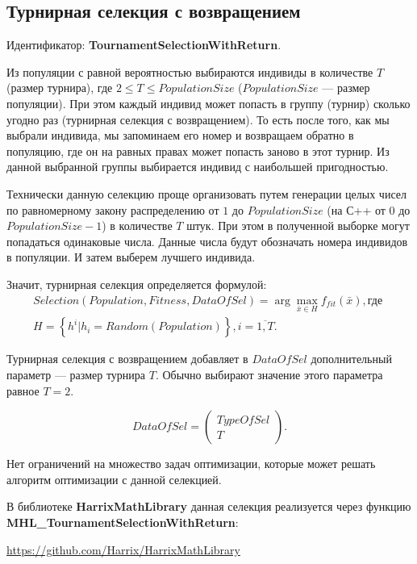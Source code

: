 \subsection{Турнирная селекция с возвращением}\label{SetOfOperatorsAlgorithms:TournamentSelectionWithReturn}

Идентификатор: \textbf{TournamentSelectionWithReturn}.

Из популяции с равной вероятностью выбираются индивиды в количестве $ T $ (размер турнира), где $ 2\leq T\leq PopulationSize $ ($ PopulationSize $ --- размер популяции). При этом каждый индивид может попасть в группу (турнир) сколько угодно раз (турнирная селекция с возвращением). То есть после того, как мы выбрали индивида, мы запоминаем его номер и возвращаем обратно в популяцию, где он на равных правах может попасть заново в этот турнир. Из данной выбранной группы выбирается индивид с наибольшей пригодностью.

Технически данную селекцию проще организовать путем генерации целых чисел по равномерному закону распределению от $ 1 $ до $ PopulationSize $ (на С++ от $ 0 $ до $ PopulationSize-1 $) в количестве $ T $ штук. При этом в полученной выборке могут попадаться одинаковые числа. Данные числа будут обозначать номера индивидов в популяции. И затем выберем лучшего индивида.

Значит, турнирная селекция определяется формулой:
\begin{align}
\label{SetOfOperatorsAlgorithms:eq:TournamentSelectionWithReturn}
Selection\left( Population, Fitness, DataOfSel\right) = \arg{\max_{\bar{x}\in H} {f_{fit}\left( \bar{x}\right) }}, \text{где }\\
H=\left\lbrace h^i | h_i=Random \left( Population \right) \right\rbrace, i=\overline{1,T}\nonumber.
\end{align}

Турнирная селекция с возвращением добавляет в $ DataOfSel $ дополнительный параметр --– размер турнира $ T $. Обычно выбирают значение этого параметра равное $ T=2 $.

\begin{equation}
DataOfSel=\left( \begin{array}{c} TypeOfSel \\ T \end{array} \right).
\end{equation}

Нет ограничений на множество задач оптимизации, которые может решать алгоритм оптимизации с данной селекцией.

В библиотеке \textbf{HarrixMathLibrary} данная селекция реализуется через функцию \textbf{MHL\_TournamentSelectionWithReturn}:

\href{https://github.com/Harrix/HarrixMathLibrary}{https://github.com/Harrix/HarrixMathLibrary}